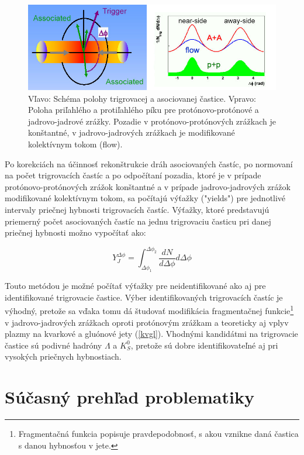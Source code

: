 \documentclass[thesismargins, thesislinespacing]{rnthesis}
\begin{document}
\begin{figure}[hbtp!]
	\begin{center}
		\includegraphics[width=\textwidth]{./Obrazky_praca/dijetcorrelations.png}
		\caption{Vľavo: Schéma polohy trigrovacej a asociovanej častice. Vpravo: Poloha priľahlého a protiľahlého píku pre protónovo-protónové a jadrovo-jadrové zrážky. Pozadie v protónovo-protónových zrážkach je konštantné, v jadrovo-jadrových zrážkach je \-mo\-di\-fi\-ko\-va\-né kolektívnym tokom (flow).}
		\label{kor}
	\end{center}
\end{figure}

Po korekciách na účinnosť rekonštrukcie dráh asociovaných častíc, po normovaní na počet trigrovacích častíc a po odpočítaní pozadia, ktoré je v prípade protónovo-protónových zrážok konštantné a v prípade jadrovo-jadrových zrážok modifikované kolektívnym tokom, sa počítajú výťažky ("yields") pre jednotlivé intervaly priečnej hybnosti trigrovacích častíc. Výťažky, ktoré predstavujú priemerný počet asociovaných častíc na jednu trigrovaciu časticu pri danej priečnej hybnosti možno vypočítať ako:

\begin{equation}
Y_J^{\Delta\phi}=\int_{\Delta \phi_1}^{\Delta \phi_2} \frac{dN}{d\Delta \phi } d\Delta\phi 
\label{yield}
\end{equation} 

Touto metódou je možné počítať výťažky pre neidentifikované ako aj pre identifikované trigrovacie častice. Výber identifikovaných trigrovacích častíc je výhodný, pretože sa vďaka tomu dá študovať modifikácia fragmentačnej funkcie\footnote{Fragmentačná funkcia popisuje pravdepodobnosť, s akou vznikne daná častica s danou hybnosťou v jete.} v jadrovo-jadrových zrážkach oproti protónovým zrážkam a teoreticky aj vplyv plazmy na kvarkové a gluónové jety (\ref{kvgl}). Vhodnými kandidátmi na trigrovacie častice sú podivné hadróny $\Lambda$ a $K^0_S$, pretože sú dobre identifikovateľné aj pri vysokých priečnych hybnostiach. 

\section{Súčasný prehľad problematiky}
\end{document}

